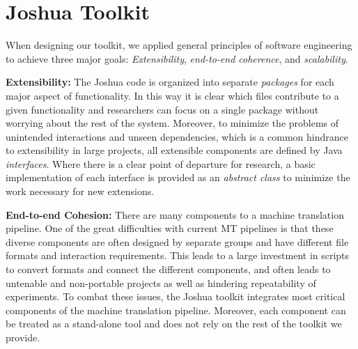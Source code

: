 \documentclass[11pt]{article}
\begin{document}


\section{Joshua Toolkit}
When designing our toolkit, we applied general principles of software engineering to achieve three major goals: \emph{Extensibility}, \emph{end-to-end coherence}, and \emph{scalability}.

\textbf{Extensibility:} The Joshua code is organized into separate \emph{packages} for each major aspect of functionality. In this way it is clear which files contribute to a given functionality and researchers can focus on a single package without worrying about the rest of the system. Moreover, to minimize the problems of unintended interactions and unseen dependencies, which is a common hindrance to extensibility in large projects, all extensible components are defined by Java \emph{interfaces}. Where there is a clear point of departure for research, a basic implementation of each interface is provided as an \emph{abstract class} to minimize the work necessary for new extensions.

\textbf{End-to-end Cohesion:} There are many components to a machine translation pipeline. One of the great difficulties with current MT pipelines is that these diverse components are often designed by separate groups and have different file formats and interaction requirements. This leads to a large investment in scripts to convert formats and connect the different components, and often leads to untenable and non-portable projects as well as hindering repeatability of experiments.
To combat these issues, the Joshua toolkit integrates most critical components of the machine translation pipeline. Moreover, each component can be treated as a stand-alone tool and does not rely on the rest of the toolkit we provide.
\end{document}
